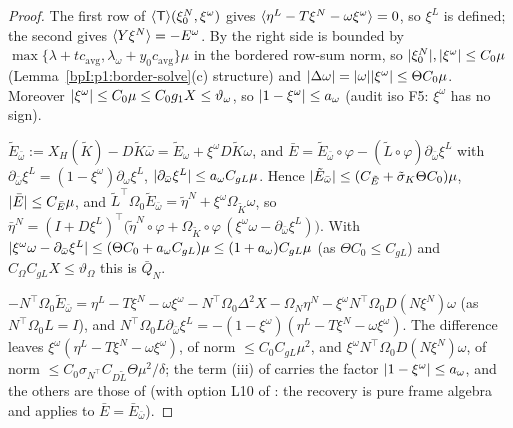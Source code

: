 \begin{proof}
\label{stepI:p2s2:st-av}
The first row of $\langle \mathsf T\rangle(\xi^N_0,\xi^\omega)$ gives $\langle \eta^L-T\xi^N-\omega\xi^\omega\rangle=0$, so $\xi^L$ is defined; the second gives $\langle Y\xi^N\rangle=-E^\omega$.
By  the right side is bounded by $\max\{\lambda+tc_{\mathrm{avg}},\lambda_\omega+y_0c_{\mathrm{avg}}\}\mu$ in the bordered
row-sum norm, so $\lvert \xi^N_0\rvert,\lvert \xi^\omega\rvert\le C_0\mu$ (Lemma~\ref{bpI:p1:border-solve}(c) structure) and $\lvert \Delta\omega\rvert=\lvert \omega\rvert\lvert \xi^\omega\rvert\le\Theta C_0\mu$. Moreover
$\lvert \xi^\omega\rvert\le C_0\mu\le C_0g_1X\le\vartheta_\omega$, so $\lvert 1-\xi^\omega\rvert\le a_\omega$ (audit iso F5: $\xi^\omega$ has no sign).

\label{stepI:p2s2:st-w}
$\tilde E_{\bar\omega}:=X_H(\tilde K)-D\tilde K\bar\omega=\tilde E_\omega+\xi^\omega D\tilde K\omega$, and $\bar E=\tilde E_{\bar\omega}\circ\varphi-(\tilde L\circ\varphi)\partial_{\bar\omega}\xi^L$ with
$\partial_{\bar\omega}\xi^L=(1-\xi^\omega)\partial_\omega\xi^L$, $\lvert \partial_{\bar\omega}\xi^L\rvert\le a_\omega C_{gL}\mu$. Hence $\lvert \tilde E_{\bar\omega}\rvert\le(C_{\tilde E}+\tilde\sigma_K\Theta C_0)\mu$,
$\lvert \bar E\rvert\le C_{\bar E}\mu$, and $\tilde L^\top\Omega_0\tilde E_{\bar\omega}=\tilde\eta^N+\xi^\omega\Omega_{\tilde K}\omega$, so
$\bar\eta^N=(I+D\xi^L)^\top\bigl(\tilde\eta^N\circ\varphi+\Omega_{\tilde K}\circ\varphi\,(\xi^\omega\omega-\partial_{\bar\omega}\xi^L)\bigr)$. With
$\lvert \xi^\omega\omega-\partial_{\bar\omega}\xi^L\rvert\le(\Theta C_0+a_\omega C_{gL})\mu\le(1+a_\omega)C_{gL}\mu$ (as $\Theta C_0\le C_{gL}$) and $C_\Omega C_{gL}X\le\vartheta_\Omega$ this is
$\bar Q_N$.

\label{stepI:p2s2:st-l}
$-N^\top\Omega_0\tilde E_{\bar\omega}=\eta^L-T\xi^N-\omega\xi^\omega-N^\top\Omega_0\Delta^2X-\Omega_N\eta^N-\xi^\omega N^\top\Omega_0D(N\xi^N)\omega$ (as $N^\top\Omega_0L=I$), and
$N^\top\Omega_0L\partial_{\bar\omega}\xi^L=-(1-\xi^\omega)(\eta^L-T\xi^N-\omega\xi^\omega)$. The difference leaves $\xi^\omega(\eta^L-T\xi^N-\omega\xi^\omega)$, of norm $\le C_0C_{gL}\mu^2$,
and $\xi^\omega N^\top\Omega_0D(N\xi^N)\omega$, of norm $\le C_0\sigma_{N^\top}C_{D\tilde L}\Theta\mu^2/\delta$; the term (iii) of  carries the factor
$\lvert 1-\xi^\omega\rvert\le a_\omega$, and the others are those of  (with option L10 of : the recovery is pure frame
algebra and applies to $\bar E=\bar E_{\bar\omega}$).


\end{proof}
